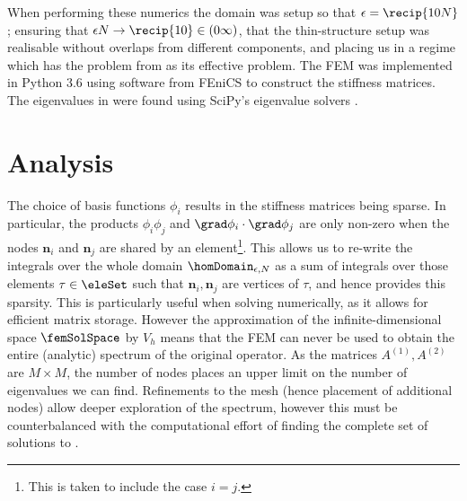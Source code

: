 When performing these numerics the domain was setup so that $\epsilon=\recip{10N}$; ensuring that $\epsilon N\rightarrow\recip{10}\in(0\infty)$, that the thin-structure setup was realisable without overlaps from different components, and placing us in a regime which has the problem from  as its effective problem.
The FEM was implemented in Python 3.6 using software from FEniCS \cite{AlnaesBlechta2015a} to construct the stiffness matrices.
The eigenvalues in  were found using SciPy's eigenvalue solvers \cite{scipyReference}.

\section{Analysis} \label{sec:NumResultsFEM}
The choice of basis functions $\phi_{i}$ results in the stiffness matrices being sparse.
In particular, the products $\phi_{i}\phi_{j}$ and $\grad\phi_{i}\cdot\grad\phi_{j}$ are only non-zero when the nodes $\mathbf{n}_{i}$ and $\mathbf{n}_{j}$ are shared by an element\footnote{This is taken to include the case $i=j$.}.
This allows us to re-write the integrals over the whole domain $\homDomain_{\epsilon, N}$ as a sum of integrals over those elements $\tau\in\eleSet$ such that $\mathbf{n}_{i},\mathbf{n}_{j}$ are vertices of $\tau$, and hence provides this sparsity.
This is particularly useful when solving  numerically, as it allows for efficient matrix storage. 
However the approximation of the infinite-dimensional space $\femSolSpace$ by $V_{h}$ means that the FEM can never be used to obtain the entire (analytic) spectrum of the original operator.
As the matrices $A^{(1)},A^{(2)}$ are $M\times M$, the number of nodes places an upper limit on the number of eigenvalues we can find.
Refinements to the mesh (hence placement of additional nodes) allow deeper exploration of the spectrum, however this must be counterbalanced with the computational effort of finding the complete set of solutions to . \newline

